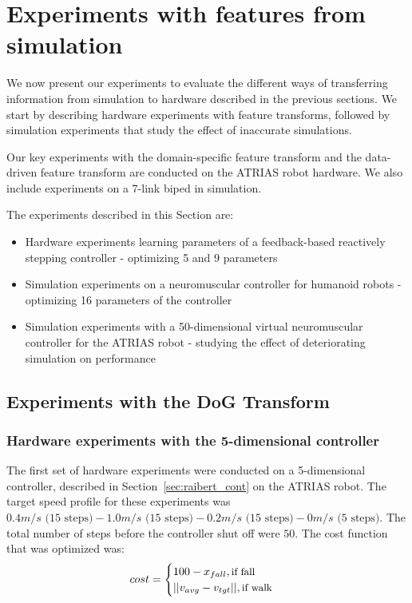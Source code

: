 \chapter{Experiments with features from simulation}
\label{chap:expts}

We now present our experiments to evaluate the different ways of transferring information from simulation to hardware described in the previous sections. We start by describing hardware experiments with feature transforms, followed by simulation experiments that study the effect of inaccurate simulations. 


Our key experiments with the domain-specific feature transform and the data-driven feature transform are conducted on the ATRIAS robot hardware. We also include experiments on a 7-link biped in simulation. 

The experiments described in this Section are:
\begin{itemize}
    \item Hardware experiments learning parameters of a feedback-based reactively stepping controller - optimizing 5 and 9 parameters 
    \item Simulation experiments on a neuromuscular controller for humanoid robots - optimizing 16 parameters of the controller
    \item Simulation experiments with a 50-dimensional virtual neuromuscular controller for the ATRIAS robot -  studying the effect of deteriorating simulation on performance
\end{itemize}

\section{Experiments with the DoG Transform}
\label{sec:dog_expts}
\subsection{Hardware experiments with the 5-dimensional controller}
\label{sec:hdw_5d}
The first set of hardware experiments were conducted on a 5-dimensional controller, described in Section~\ref{sec:raibert_cont} on the ATRIAS robot. The target speed profile for these experiments was $0.4 m/s \text{ (15 steps)} - 1.0 m/s \text{ (15 steps)} - 0.2 m/s \text{ (15 steps)} - 0 m/s \text{ (5 steps)}$. The total number of steps before the controller shut off were $50$. The cost function that was optimized was:
\begin{equation}
    \label{eq:hdw_cost}
    cost = 
    \begin{cases}
		100 - x_{fall} , \text{\small{if fall}} \\
		||v_{avg} - v_{tgt}||, \text{\small{if walk}}\\
	\end{cases}
\end{equation}

